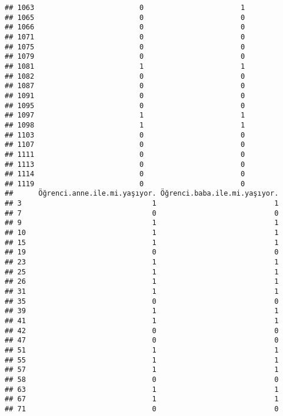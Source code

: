 \documentclass[
]{article}
\begin{document}
\begin{verbatim}
## 1063                         0                       1
## 1065                         0                       0
## 1066                         0                       0
## 1071                         0                       0
## 1075                         0                       0
## 1079                         0                       0
## 1081                         1                       1
## 1082                         0                       0
## 1087                         0                       0
## 1091                         0                       0
## 1095                         0                       0
## 1097                         1                       1
## 1098                         1                       1
## 1103                         0                       0
## 1107                         0                       0
## 1111                         0                       0
## 1113                         0                       0
## 1114                         0                       0
## 1119                         0                       0
##      Öğrenci.anne.ile.mi.yaşıyor. Öğrenci.baba.ile.mi.yaşıyor.
## 3                               1                            1
## 7                               0                            0
## 9                               1                            1
## 10                              1                            1
## 15                              1                            1
## 19                              0                            0
## 23                              1                            1
## 25                              1                            1
## 26                              1                            1
## 31                              1                            1
## 35                              0                            0
## 39                              1                            1
## 41                              1                            1
## 42                              0                            0
## 47                              0                            0
## 51                              1                            1
## 55                              1                            1
## 57                              1                            1
## 58                              0                            0
## 63                              1                            1
## 67                              1                            1
## 71                              0                            0

\end{verbatim}
\end{document}
